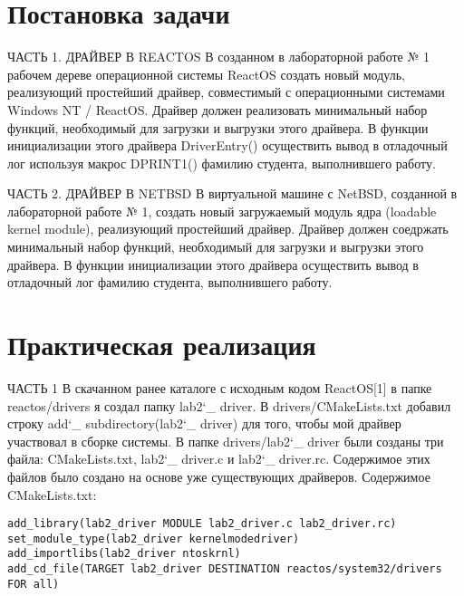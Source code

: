 \documentclass[a4paper, 14pt]{extarticle}
\begin{document}
\section{Постановка задачи}
\begin{flushleft}
ЧАСТЬ 1. ДРАЙВЕР В REACTOS \newline
В созданном в лабораторной работе № 1 рабочем дереве операционной
системы ReactOS создать новый модуль, реализующий простейший драйвер,
совместимый с операционными системами Windows NT / ReactOS. Драйвер
должен реализовать минимальный набор функций, необходимый для загрузки и
выгрузки этого драйвера. В функции инициализации этого драйвера DriverEntry() осуществить вывод в отладочный лог используя макрос DPRINT1()
фамилию студента, выполнившего работу. \newline

ЧАСТЬ 2. ДРАЙВЕР В NETBSD \newline
В виртуальной машине с NetBSD, созданной в лабораторной работе № 1,
создать новый загружаемый модуль ядра (loadable kernel module), реализующий
простейший драйвер. Драйвер должен соедржать минимальный набор функций,
необходимый для загрузки и выгрузки этого драйвера. В функции инициализации этого драйвера осуществить вывод в отладочный лог фамилию
студента, выполнившего работу.

\end{flushleft}
\pagebreak

\section{Практическая реализация}
\begin{flushleft}
ЧАСТЬ 1 \newline
В скачанном ранее каталоге с исходным кодом ReactOS[1] в папке reactos/drivers я создал папку lab2\char`_ driver. В drivers/CMakeLists.txt добавил строку add\char`_ subdirectory(lab2\char`_ driver) для того, чтобы мой драйвер участвовал в сборке
системы. В папке drivers/lab2\char`_ driver были созданы три файла: CMakeLists.txt, lab2\char`_ driver.c и lab2\char`_ driver.rc. Содержимое этих файлов было создано на основе уже существующих драйверов. Содержимое CMakeLists.txt:
\end{flushleft}
\begin{verbatim}
add_library(lab2_driver MODULE lab2_driver.c lab2_driver.rc)
set_module_type(lab2_driver kernelmodedriver)
add_importlibs(lab2_driver ntoskrnl)
add_cd_file(TARGET lab2_driver DESTINATION reactos/system32/drivers FOR all)
\end{verbatim}
\end{document}
